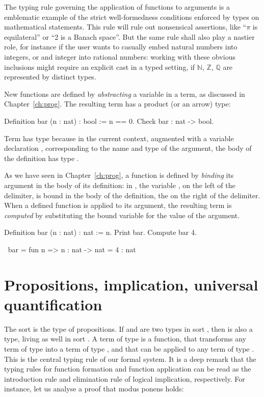 The typing rule governing the application of functions to arguments is
a emblematic example of the strict well-formedness conditions enforced
by types on mathematical statements. This rule will rule out
nonsensical assertions, like ``$\pi$ is equilateral'' or ``2 is a
Banach space''. But the same rule shall also play a nastier role, for
instance if the user wants to casually embed natural numbers into
integers, or and integer into rational numbers: working with these
obvious inclusions might require an explicit cast in a typed setting,
if $\mathbb{N}$, $\mathbb{Z}$, $\mathbb{Q}$ are represented by
distinct types.


New functions are defined by \emph{abstracting} a variable in a term,
as discussed in Chapter~\ref{ch:prog}. The resulting term has a
product (or an arrow) type:

\begin{coq}{}{}
Definition bar (n : nat) : bool := 
  n == 0.
Check bar : nat -> bool.
\end{coq}

Term  has type  because in the current context,
augmented with a variable declaration , corresponding to
the name and type of the argument, the body  of the definition
 has type .

As we have seen in Chapter~\ref{ch:prog}, a function is defined by
\emph{binding} its argument in the body of its definition: in
, the variable , on the left of the \C{:=} delimiter, is
bound in the body of the definition, the  on the right of the \C{:=}
delimiter. When a defined function is applied to its argument, the
resulting term is \emph{computed} by substituting the bound variable
for the value of the argument.

\begin{coq-left}{}{}
Definition bar (n : nat) : nat := n.
Print bar.
Compute bar 4.
\end{coq-left}
\begin{coqout-right}
$~$
bar = fun n => n : nat -> nat
= 4 : nat
\end{coqout-right}


\section{Propositions, implication, universal quantification}\label{sec:propiuq}

The sort  is the type of propositions. If  and  are
two types in sort , then  is also a type, living as well in
sort . A term of type  is a function, that
transforms any term of type  into a term of type , and that
can be applied to any term of type . This is the central typing
rule of our formal system. It is a deep remark that the
typing rules for function formation and function application
can be read as the
introduction rule and elimination rule of logical implication,
respectively.
For instance, let us analyse a proof that modus ponens holds:

